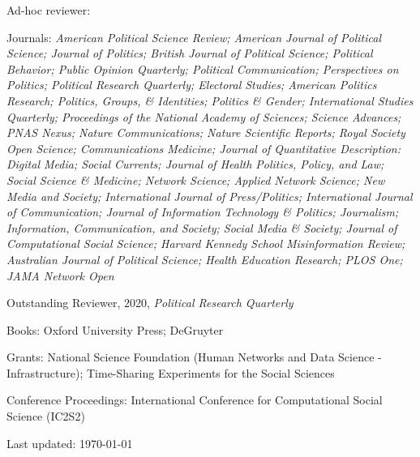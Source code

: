 \documentclass[letterpaper]{article}
\renewenvironment{itemize}{
  \begin{list}{}{
    \setlength{\leftmargin}{1.5em}
  }
}{
  \end{list}
}
\begin{document}
\begin{itemize}
\item Ad-hoc reviewer:
\begin{itemize}
\item Journals: \textit{American Political Science Review; American Journal of Political Science; Journal of Politics; British Journal of Political Science; Political Behavior; Public Opinion Quarterly; Political Communication; Perspectives on Politics; Political Research Quarterly; Electoral Studies; American Politics Research; Politics, Groups, \& Identities; Politics \& Gender; International Studies Quarterly; Proceedings of the National Academy of Sciences; Science Advances; PNAS Nexus; Nature Communications; Nature Scientific Reports; Royal Society Open Science; Communications Medicine; Journal of Quantitative Description: Digital Media; Social Currents; Journal of Health Politics, Policy, and Law; Social Science \& Medicine; Network Science; Applied Network Science; New Media and Society; International Journal of Press/Politics; International Journal of Communication; Journal of Information Technology \& Politics; Journalism; Information, Communication, and Society; Social Media \& Society; Journal of Computational Social Science; Harvard Kennedy School Misinformation Review; Australian Journal of Political Science; Health Education Research; PLOS One; JAMA Network Open}
	\begin{itemize}
	\item Outstanding Reviewer, 2020, \textit{Political Research Quarterly}
	\end{itemize}
\item Books: Oxford University Press; DeGruyter
\item Grants: National Science Foundation (Human Networks and Data Science - Infrastructure); Time-Sharing Experiments for the Social Sciences
\item Conference Proceedings: International Conference for Computational Social Science (IC2S2)
\end{itemize}
\end{itemize}

\begin{center}
  \begin{footnotesize}
    Last updated: \today
      \end{footnotesize}
\end{center}
\end{document}
